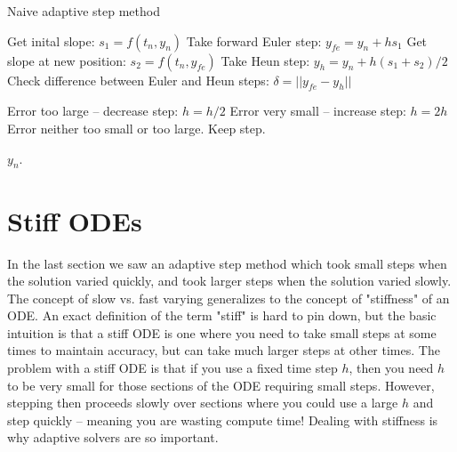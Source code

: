 \documentclass[hidelinks,notitlepage]{book}
\begin{document}
\begin{algorithm}
	\caption{Naive adaptive step method}
	\label{alg:NaiveAdaptiveStep}
	\begin{algorithmic} 
		\STATE Get inital slope: $s_1 = f(t_n, y_n)$
		\STATE Take forward Euler step: $y_{fe} = y_n + h s_1$
		\STATE Get slope at new position: $s_2 = f(t_n, y_{fe})$
		\STATE Take Heun step: $y_h = y_n + h (s_1+s_2)/2$
		\STATE Check difference between Euler and Heun steps: $\delta = ||y_{fe}-y_h||$
		
		\STATE Error too large -- decrease step: $h = h/2$
		\STATE Error very small -- increase step: $h = 2 h$
  		\ELSE
		\STATE Error neither too small or too large.  Keep step.
		\ENDIF
		
		\ENDFOR
		\RETURN ${y_n}$.
	\end{algorithmic}
\end{algorithm}


\section{Stiff ODEs}
\label{sect:StiffODEs}
In the last section we saw an adaptive step method which took small steps when the solution varied quickly, and took larger steps when the solution varied slowly.  The concept of slow vs. fast varying generalizes to the concept of "stiffness" of an ODE.  An exact definition of the term "stiff" is hard to pin down, but the basic intuition is that a stiff ODE is one where you need to take small steps at some times to maintain accuracy, but can take much larger steps at other times.  The problem with a stiff ODE is that if you use a fixed time step $h$, then you need $h$ to be very small for those sections of the ODE requiring small steps.  However, stepping then proceeds slowly over sections where you could use a large $h$ and step quickly -- meaning you are wasting compute time!  Dealing with stiffness is why adaptive solvers are so important.
\end{document}
